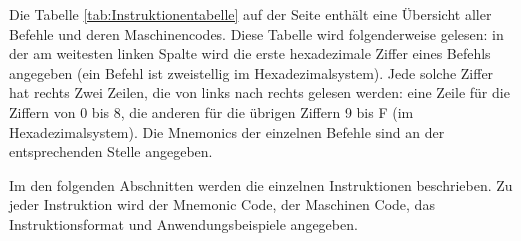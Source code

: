 


Die Tabelle \ref{tab:Instruktionentabelle} auf der Seite 
\pageref{tab:Instruktionentabelle} enthält eine Übersicht aller Befehle und
deren Maschinencodes.
Diese Tabelle wird folgenderweise gelesen:
in der am weitesten linken Spalte wird die erste hexadezimale Ziffer eines
Befehls angegeben (ein Befehl ist zweistellig im Hexadezimalsystem).
Jede solche Ziffer hat rechts Zwei Zeilen, die von links nach rechts gelesen
werden: eine Zeile für die Ziffern von 0 bis 8, die anderen für die übrigen
Ziffern 9 bis F (im Hexadezimalsystem). Die Mnemonics der einzelnen Befehle sind
an der entsprechenden Stelle angegeben.

Im den folgenden Abschnitten werden die einzelnen Instruktionen beschrieben.
Zu jeder Instruktion wird der \glqq Mnemonic Code\grqq, der Maschinen Code, das
Instruktionsformat und Anwendungsbeispiele angegeben.



